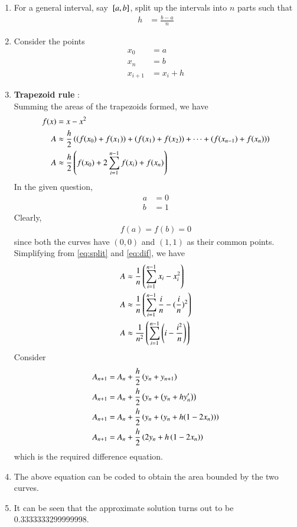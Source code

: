 \documentclass[journal]{IEEEtran}
\begin{document}
\begin{enumerate}
\item For a general interval, say ${}\left[a,b\right]$, split up the intervals into $n$ parts such that
\begin{align}
	h &= \frac{b-a}{n} \label{eq:split}
\end{align}
\item Consider the points 
\begin{align}
	x_{0} &= a \\
	x_{n} &= b \\
	x_{i+1} &= x_{i} + h
\end{align}
\item \textbf{Trapezoid rule} : \\
Summing the areas of the trapezoids formed, we have
\begin{align}
	f(x) &= x - x^2 \\
	A &\approx \frac{h}{2} \left((f(x_{0}) + f(x_{1})) + (f(x_{1}) + f(x_{2})) + \dots + (f(x_{n-1}) + f(x_{n}))\right) \\
	A &\approx \frac{h}{2} \left(f(x_{0}) + 2 \sum_{i=1}^{n-1} f(x_{i}) + f(x_{n}) \right) \label{eq:dif}
\end{align}
In the given question, 
\begin{align}
	a &= 0 \\
	b &= 1
\end{align}
Clearly, 
\begin{align}
	f(a) = f(b) = 0
\end{align}
since both the curves have $(0,0)$ and $(1,1)$ as their common points. Simplifying from \eqref{eq:split} and \eqref{eq:dif}, we have
\begin{align}
	A &\approx \frac{1}{n} \left(\sum_{i=1}^{n-1} x_{i} - x_{i}^2 \right) \\
	A &\approx \frac{1}{n} \left(\sum_{i=1}^{n-1} \frac{i}{n}  - (\frac{i}{n} )^2 \right) \\
	A &\approx \frac{1}{n^2} \left( \sum_{i=1}^{n-1} \left(i - \frac{i^2}{n} \right) \right) \label{eq:diff}
\end{align}
Consider
\begin{align}
A_{n+1} &= A_{n} + \frac{h}{2} \left(y_{n} + y_{n+1}\right) \\
A_{n+1} &= A_{n} + \frac{h}{2} \left(y_{n} + \left(y_{n} + h y^{\prime}_{n}\right)\right) \\
A_{n+1} &= A_{n} + \frac{h}{2} \left(y_{n} + \left(y_{n} + h (1 - 2x_{n} )\right) \right) \\
A_{n+1} &= A_{n} + \frac{h}{2} \left(2 y_{n} + h \left(1 - 2 x_{n}\right)\right)
\end{align}
which is the required difference equation.
\item The above equation can be coded to obtain the area bounded by the two curves.
\item It can be seen that the approximate solution turns out to be 0.3333333299999998.
\end{enumerate}
\end{document}
